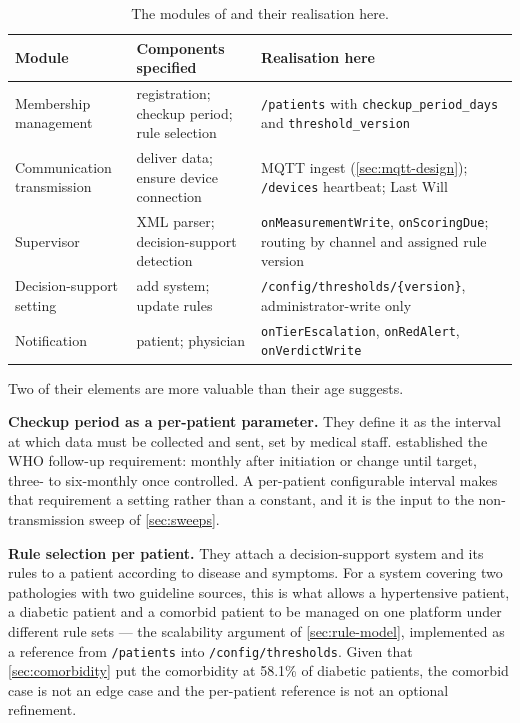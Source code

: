 \documentclass[12pt,a4paper,oneside]{report}
\begin{document}
\begin{table}[htbp]
\centering\footnotesize
\caption{The modules of \textcite{yazdani2018} and their realisation here.}\label{tab:modules}
\begin{tabularx}{\textwidth}{@{}>{\raggedright\arraybackslash}p{3.0cm} >{\raggedright\arraybackslash}p{3.6cm} X@{}}
\toprule
\textbf{Module} & \textbf{Components specified} & \textbf{Realisation here} \\
\midrule
Membership management & registration; checkup period; rule selection & \texttt{/patients} with \texttt{checkup\_period\_days} and \texttt{threshold\_version} \\
Communication transmission & deliver data; ensure device connection & MQTT ingest (\cref{sec:mqtt-design}); \texttt{/devices} heartbeat; Last Will \\
Supervisor & XML parser; decision-support detection & \texttt{onMeasurementWrite}, \texttt{onScoringDue}; routing by channel and assigned rule version \\
Decision-support setting & add system; update rules & \texttt{/config/thresholds/\{version\}}, administrator-write only \\
Notification & patient; physician & \texttt{onTierEscalation}, \texttt{onRedAlert}, \texttt{onVerdictWrite} \\
\bottomrule
\end{tabularx}
\end{table}

Two of their elements are more valuable than their age suggests.

\textbf{Checkup period as a per-patient parameter.} They define it as the interval at which data must be collected and sent, set by medical staff.  established the WHO follow-up requirement: monthly after initiation or change until target, three- to six-monthly once controlled. A per-patient configurable interval makes that requirement a setting rather than a constant, and it is the input to the non-transmission sweep of \cref{sec:sweeps}.

\textbf{Rule selection per patient.} They attach a decision-support system and its rules to a patient according to disease and symptoms. For a system covering two pathologies with two guideline sources, this is what allows a hypertensive patient, a diabetic patient and a comorbid patient to be managed on one platform under different rule sets --- the scalability argument of \cref{sec:rule-model}, implemented as a reference from \texttt{/patients} into \texttt{/config/thresholds}. Given that \cref{sec:comorbidity} put the comorbidity at 58.1\% of diabetic patients, the comorbid case is not an edge case and the per-patient reference is not an optional refinement.
\end{document}
